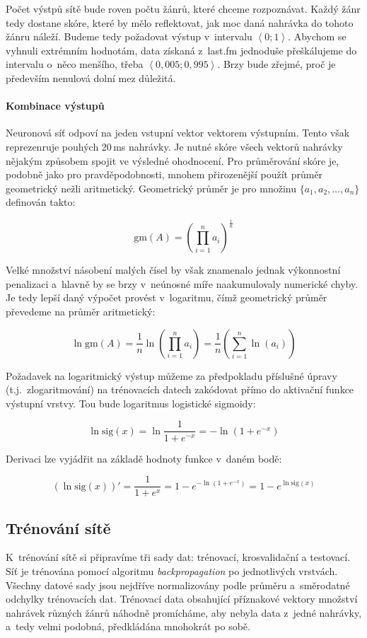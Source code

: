 \documentclass[10pt,a4paper,twocolumn]{article}
\begin{document}
Počet výstpů sítě bude roven počtu žánrů, které chceme rozpoznávat.
Každý žánr tedy dostane skóre, které by mělo reflektovat, jak moc daná nahrávka
do tohoto žánru náleží. Budeme tedy požadovat výstup v~intervalu $\left<0; 1\right>$.
Abychom se vyhnuli extrémním hodnotám, data získaná z~last.fm jednoduše přeškálujeme
do intervalu o~něco menšího, třeba $\left<0,005; 0,995\right>$. Brzy bude zřejmé, proč je především
nenulová dolní mez důležitá.

\paragraph{Kombinace výstupů} Neuronová síť odpoví na jeden vstupní vektor vektorem výstupním.
Tento však reprezenruje pouhých 20\,ms nahrávky.
Je nutné skóre všech vektorů nahrávky nějakým způsobem spojit ve výsledné ohodnocení.
Pro průměrování skóre je, podobně jako pro pravděpodobnosti, mnohem přirozenější
použít průměr geometrický nežli aritmetický.
Geometrický průměr je pro množinu $\{a_1,a_2,\ldots,a_n\}$ definován takto:

$$ \mbox{gm}(A) = \left(\prod_{i=1}^na_i\right)^{\frac{1}{n}} $$

Velké množství násobení malých čísel by však znamenalo jednak výkonnostní
penalizaci a~hlavně by se brzy v~neúnosné míře naakumulovaly numerické chyby.
Je tedy lepší daný výpočet provést v~logaritmu, čímž geometrický průměr
převedeme na průměr aritmetický:

$$
\ln\mbox{gm}(A)
= \frac{1}{n}\ln\left(\prod_{i=1}^na_i\right)
= \frac{1}{n}\left(\sum_{i=1}^n\ln(a_i)\right)
$$

Požadavek na logaritmický výstup můžeme za předpokladu příslušné úpravy (t.j.~zlogaritmování)
na trénovacích datech zakódovat přímo do aktivační funkce výstupní vrstvy.
Tou bude logaritmus logistické sigmoidy:

$$ \ln\mbox{sig}(x) = \ln\frac{1}{1+e^{-x}} = -\ln(1 + e^{-x}) $$

Derivaci lze vyjádřit na základě hodnoty funkce v~daném bodě:

$$ (\ln\mbox{sig}(x))' = \frac{1}{1+e^{x}} = 1-e^{-\ln(1 + e^{-x})} = 1 - e^{\ln\mathrm{sig}(x)} $$

\subsection{Trénování sítě}

K~trénování sítě si připravíme tři sady dat: trénovací, krosvalidační a testovací.
Síť je trénována pomocí algoritmu \emph{backpropagation} po jednotlivých vrstvách.
Všechny datové sady jsou nejdříve normalizovány podle průměru a~směrodatné odchylky
trénovacích dat. Trénovací data obsahující příznakové vektory množství nahrávek různých
žánrů náhodně promícháme, aby nebyla data z~jedné nahrávky, a~tedy velmi podobná,
předkládána mnohokrát po sobě.
\end{document}
